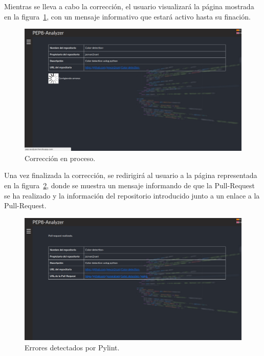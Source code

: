 \documentclass[a4paper, 12pt]{book}
\begin{document}
Mientras se lleva a cabo la corrección, el usuario visualizará la página mostrada en la figura~\ref{fig:paso5}, con un mensaje informativo que estará activo hasta su finación.
\newpage
\begin{figure}[h]
  \centering
  \includegraphics[width=13cm, keepaspectratio]{img/paso5.png}
  \caption{Corrección en proceso.}\label{fig:paso5}
\end{figure}
Una vez finalizada la corrección, se redirigirá al usuario a la página representada en la figura~\ref{fig:paso6}, donde se muestra un mensaje informando de que la Pull-Request se ha realizado y la información del repositorio introducido junto a un enlace a la Pull-Request.
\begin{figure}[h]
  \centering
  \includegraphics[width=13cm, keepaspectratio]{img/paso6.png}
  \caption{Errores detectados por Pylint.}\label{fig:paso6}
\end{figure}

\cleardoublepage


\end{document}
